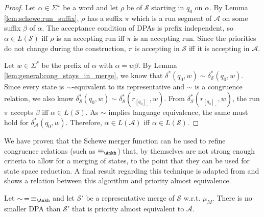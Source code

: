 \begin{proof}
	Let $\alpha \in \Sigma^\omega$ be a word and let $\rho$ be of $\mathcal{S}$ starting in $q_0$ on $\alpha$. By Lemma \ref{lem:schewe:run_suffix}, $\rho$ has a suffix $\pi$ which is a run segment of $\mathcal{A}$ on some suffix $\beta$ of $\alpha$. The acceptance condition of DPAs is prefix independent, so $\alpha \in L(\mathcal{S})$ iff $\rho$ is an accepting run iff $\pi$ is an accepting run. Since the priorities do not change during the construction, $\pi$ is accepting in $\mathcal{S}$ iff it is accepting in $\mathcal{A}$.
	
	Let $w \in \Sigma^*$ be the prefix of $\alpha$ with $\alpha = w \beta$. By Lemma \ref{lem:general:cong_stays_in_merge}, we know that $\delta^*(q_0, w) \sim \delta^*_\mathcal{S}(q_0, w)$. Since every state is $\sim$-equivalent to its representative and $\sim$ is a congruence relation, we also know $\delta^*_\mathcal{S}(q_0, w) \sim \delta^*_\mathcal{S}(r_{[q_0]_\sim}, w)$. From $\delta^*_\mathcal{S}(r_{[q_0]_\sim}, w)$, the run $\pi$ accepts $\beta$ iff $\alpha \in L(\mathcal{S})$. As $\sim$ implies language equivalence, the same must hold for $\delta^*_\mathcal{A}(q_0, w)$. Therefore, $\alpha \in L(\mathcal{A})$ iff $\alpha \in L(\mathcal{S})$.
\end{proof}

\vspace{5pt}

We have proven that the Schewe merger function can be used to refine congruence relations (such as $\equiv_\text{\Ankh}$) that, by themselves are not strong enough criteria to allow for a merging of states, to the point that they can be used for state space reduction. A final result regarding this technique is adapted from \cite{Schewe2010} and shows a relation between this algorithm and priority almost equivalence.

\begin{lem}
	Let $\sim \,=\, \equiv_\text{\Ankh}$ and let $\mathcal{S}'$ be a representative merge of $\mathcal{S}$ w.r.t. $\mu_M$. There is no smaller DPA than $\mathcal{S}'$ that is priority almost equivalent to $\mathcal{A}$.
\end{lem} 


